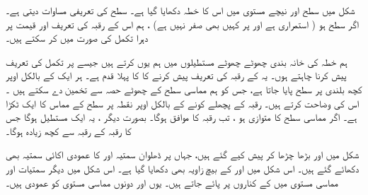  شکل   میں سطح   اور   نیچے مستوی میں  اس کا   خطہ   دکھایا گیا ہے۔ سطح کی تعریفی مساوات    دیتی  ہے۔اگر سطح    ہو   ( استمراری ہے اور پر کہیں بھی صفر نہیں ہے) ، ہم اس کے رقبہ کی تعریف اور قیمت پر دہرا تکمل کی صورت میں کر سکتے ہیں۔ 
 
 ہم  خطہ کی خانہ بندی چھوٹے چھوٹے مستطیلوں   میں ہم  یوں  کرتے ہیں  جیسے  پر تکمل کی تعریف پیش کرنا چاہتے ہوں۔ یہ کے رقبہ کی تعریف پیش کرنے کا کا پہلا قدم ہے۔ ہر ایک کے بالکل اوپر کچھ بلندی پر سطح پایا جاتا ہے،  جس کو ہم  مماسی سطح کے چھوٹے حصہ سے تخمین دے سکتے ہیں ۔ اس کی  وضاحت کرتے ہیں۔ رقبہ کے پچھلے کونے کے بالکل اوپر نقطہ پر سطح کے مماس کا ایک ٹکڑا ہے۔ اگر مماسی سطح کا متوازی ہو ، تب رقبہ کا  موافق  ہوگا۔  بصورت دیگر ، یہ ایک مستطیل ہوگا جس کا رقبہ کے رقبہ سے کچھ زیادہ ہوگا۔ 
 
  شکل  میں اور  بڑھا چڑھا کر پیش کیے گئے  ہیں،   جہاں پر ڈھلوان سمتیہ
   اور کا عمودی اکائی سمتیہ بھی  دکھائے گئے ہیں۔ اس شکل میں اور کے   بیچ  زاویہ بھی دکھایا گیا ہے۔ اس شکل میں دیگر سمتیات اور مماسی مستوی میں کے کناروں پر پائے جاتے ہیں۔ یوں اور دونوں مماسی مستوی کو عمودی ہیں۔
  
